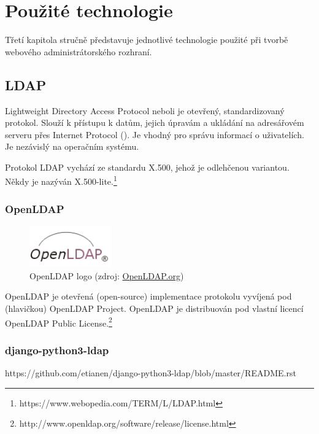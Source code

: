\chapter{Použité technologie}
\label{3-technologie}

Třetí kapitola stručně představuje jednotlivé technologie použité při
tvorbě webového administrátorského rozhraní.

\section{LDAP}

Lightweight Directory Access Protocol neboli  je otevřený, standardizovaný protokol. Slouží k přístupu k datům, jejich úpravám a ukládání na adresářovém serveru přes Internet Protocol (). Je vhodný pro správu informací o uživatelích. Je nezávislý na operačním systému.

Protokol LDAP vychází ze standardu X.500, jehož je odlehčenou variantou. Někdy je nazýván X.500-lite.\footnote{https://www.webopedia.com/TERM/L/LDAP.html}

\subsection{OpenLDAP}

\begin{figure}[H] \centering
      \includegraphics[width=100pt]{./pictures/LDAPlogo.png}
      \caption[OpenLDAP logo]{OpenLDAP logo (zdroj:
\href{http://www.openldap.org/images/headers/LDAPlogo.gif}{OpenLDAP.org})}
      \label{fig:ldap}
  \end{figure}

OpenLDAP je otevřená (open-source) implementace protokolu  vyvíjená pod (hlavičkou) OpenLDAP Project. OpenLDAP je distribuován pod vlastní licencí OpenLDAP Public License.\footnote{http://www.openldap.org/software/release/license.html}

\subsection{django-python3-ldap}
https://github.com/etianen/django-python3-ldap/blob/master/README.rst


